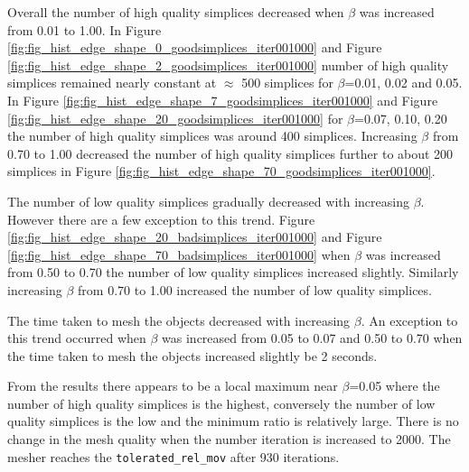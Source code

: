 \documentclass[10pt,a4paper]{book}
\begin{document}
Overall the number of high quality simplices decreased when $\beta$ was increased from 0.01 to 1.00. In Figure \ref{fig:fig_hist_edge_shape_0_goodsimplices_iter001000} and Figure \ref{fig:fig_hist_edge_shape_2_goodsimplices_iter001000} number of high quality simplices remained nearly constant at $\approx$ 500 simplices for $\beta$=0.01, 0.02 and 0.05. In Figure \ref{fig:fig_hist_edge_shape_7_goodsimplices_iter001000} and Figure \ref{fig:fig_hist_edge_shape_20_goodsimplices_iter001000} for $\beta$=0.07, 0.10, 0.20 the number of high quality simplices was around 400 simplices. Increasing $\beta$ from 0.70 to 1.00 decreased the number of high quality simplices further to about 200 simplices in Figure \ref{fig:fig_hist_edge_shape_70_goodsimplices_iter001000}. 

The number of low quality simplices gradually decreased with increasing $\beta$. However there are a few exception to this trend. Figure \ref{fig:fig_hist_edge_shape_20_badsimplices_iter001000} and Figure \ref{fig:fig_hist_edge_shape_70_badsimplices_iter001000} when $\beta$ was increased from 0.50 to 0.70 the number of low quality simplices increased slightly. Similarly increasing $\beta$ from 0.70 to 1.00 increased the number of low quality simplices.


The time taken to mesh the objects decreased with increasing $\beta$. An exception to this trend occurred when $\beta$ was increased from 0.05 to 0.07 and 0.50 to 0.70 when the time taken to mesh the objects increased slightly be 2 seconds.

From the results there appears to be a local maximum near $\beta$=0.05 where the number of high quality simplices is the highest, conversely the number of low quality simplices is the low and the minimum ratio is relatively large.
There is no change in the mesh quality when the number iteration is increased to 2000. The mesher reaches the \texttt{tolerated\_rel\_mov} after 930 iterations.
\end{document}
